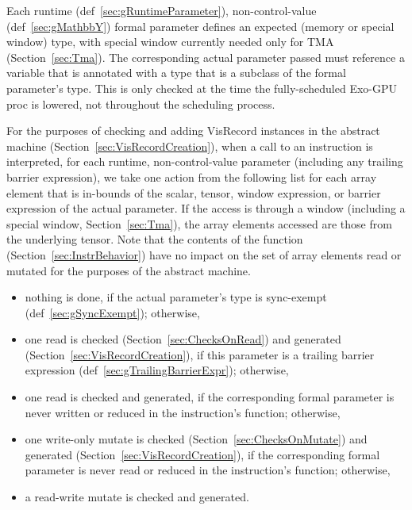 
Each runtime (def~\ref{sec:gRuntimeParameter}), non-control-value (def~\ref{sec:gMathbbY}) formal parameter defines an expected  (memory or special window) type, with special window currently needed only for TMA (Section~\ref{sec:Tma}).
The corresponding actual parameter passed must reference a variable that is annotated with a  type that is a subclass of the formal parameter's  type.
This is only checked at the time the fully-scheduled Exo-GPU proc is lowered, not throughout the scheduling process.

For the purposes of checking and adding \textsf{VisRecord} instances in the abstract machine (Section~\ref{sec:VisRecordCreation}), when a call to an instruction is interpreted, for each runtime, non-control-value parameter (including any trailing barrier expression), we take one action from the following list for each array element that is in-bounds of the scalar, tensor, window expression, or barrier expression of the actual parameter.
If the access is through a window (including a special window, Section~\ref{sec:Tma}), the array elements accessed are those from the underlying tensor.
Note that the contents of the  function (Section~\ref{sec:InstrBehavior}) have no impact on the set of array elements read or mutated for the purposes of the abstract machine.
\begin{itemize}
  \item nothing is done, if the actual parameter's  type is sync-exempt (def~\ref{sec:gSyncExempt}); otherwise,
  \item one read is checked (Section~\ref{sec:ChecksOnRead}) and generated (Section~\ref{sec:VisRecordCreation}), if this parameter is a trailing barrier expression (def~\ref{sec:gTrailingBarrierExpr}); otherwise,
  \item one read is checked and generated, if the corresponding formal parameter is never written or reduced in the instruction's  function; otherwise,
  \item one write-only mutate is checked (Section~\ref{sec:ChecksOnMutate}) and generated (Section~\ref{sec:VisRecordCreation}), if the corresponding formal parameter is never read or reduced in the instruction's  function; otherwise,
  \item a read-write mutate is checked and generated.
\end{itemize}

